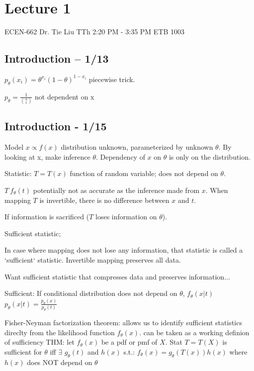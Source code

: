 \documentclass[11pt, oneside]{book}
\theoremstyle{definition}
\begin{document}
\chapter{Lecture 1}

ECEN-662
Dr. Tie Liu
TTh 2:20 PM - 3:35 PM
ETB 1003

\section{Introduction -- 1/13}

$p_\theta (x_i) = \theta^{x_i} (1-\theta)^{1- x_i}$ piecewise trick.

$p_\theta = \frac{1}{{n \choose t}}$ not dependent on x

\section{Introduction - 1/15}

Model $x \propto f(x)$ distribution unknown, parameterized by unknown $\theta$.
By looking at x, make inference $\theta$. Dependency of $x$ on $\theta$ is only on the distribution.

Statistic: $T = T(x)$ function of random variable; does not depend on $\theta$.

$ T ~ f_\theta(t)$ potentially not as accurate as the inference made from $x$.
When mapping $T$ is invertible, there is no difference between $x$ and $t$. 

If information is sacrificed ($T$ loses information on $\theta$).

Sufficient statistic;

In case where mapping does not lose any information, that statistic is called a `sufficient` statistic.
Invertible mapping preserves all data.

Want sufficient statistic that compresses data and preserves information...

Sufficient: If conditional distribution does not depend on $\theta$, $f_\theta (x | t)$
$p_\theta (x | t) = \frac{p_\theta (x)}{p_\theta(t)}$

Fisher-Neyman factorization theorem:
    allows us to identify sufficient statistics direclty from the likelihood function $f_\theta(x)$.
    can be taken as a working definion of sufficiency
    THM: let $f_\theta(x)$ be a pdf or pmf of $X$. Stat $T = T(X)$ is sufficient for $\theta$ iff $\exists$ $g_\theta(t)$ and $h(x)$ s.t.: $f_\theta(x) = g_\theta(T(x))h(x)$
        where $h(x)$ does NOT depend on $\theta$
        
\end{document}
